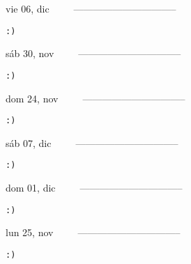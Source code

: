 \documentclass[letterpaper,10pt]{article}
\begin{document}
\begin{multicols}{3}
{vie 06, dic\ \ \ \ \ --------------------------------}
\begin{flushright}\begin{small}\texttt{:)}\end{small}\end{flushright}
\vfill
{sáb 30, nov\ \ \ \ \ --------------------------------}
\begin{flushright}\begin{small}\texttt{:)}\end{small}\end{flushright}\par
\vfill
{dom 24, nov\ \ \ \ \ --------------------------------}
\begin{flushright}\begin{small}\texttt{:)}\end{small}\end{flushright}\par
\vfill
\end{multicols}
\vspace{1.05cm}

\begin{multicols}{3}
{sáb 07, dic\ \ \ \ \ --------------------------------}
\begin{flushright}\begin{small}\texttt{:)}\end{small}\end{flushright}
\vfill
{dom 01, dic\ \ \ \ \ --------------------------------}
\begin{flushright}\begin{small}\texttt{:)}\end{small}\end{flushright}\par
\vfill
{lun 25, nov\ \ \ \ \ --------------------------------}
\begin{flushright}\begin{small}\texttt{:)}\end{small}\end{flushright}\par
\vfill
\end{multicols}
\vspace{1.05cm}
\end{document}
